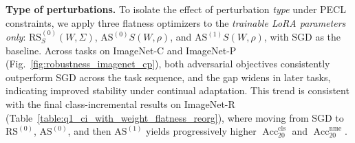 \documentclass[10pt]{article} %
\begin{document}











\noindent\textbf{Type of perturbations.}\quad
To isolate the effect of perturbation \emph{type} under PECL constraints, we apply three flatness optimizers to the \emph{trainable LoRA parameters only}:
$\mathrm{RS}^{(0)}_S(W,\Sigma)$, $\mathrm{AS}^{(0)}S(W,\rho)$, and $\mathrm{AS}^{(1)}S(W,\rho)$, with SGD as the baseline.
Across tasks on ImageNet-C and ImageNet-P (Fig.~\ref{fig:robustness_imagenet_cp}), both adversarial objectives consistently outperform SGD across the task sequence, and the gap widens in later tasks, indicating improved stability under continual adaptation. This trend is consistent with the final class-incremental results on ImageNet-R (Table~\ref{table:q1_ci_with_weight_flatness_reorg}), where moving from SGD to $\mathrm{RS}^{(0)}$, $\mathrm{AS}^{(0)}$, and then $\mathrm{AS}^{(1)}$ yields progressively higher $\operatorname{Acc}^{\mathrm{cls}}_{20}$ and $\operatorname{Acc}^{\mathrm{nme}}_{20}$.
\end{document}

